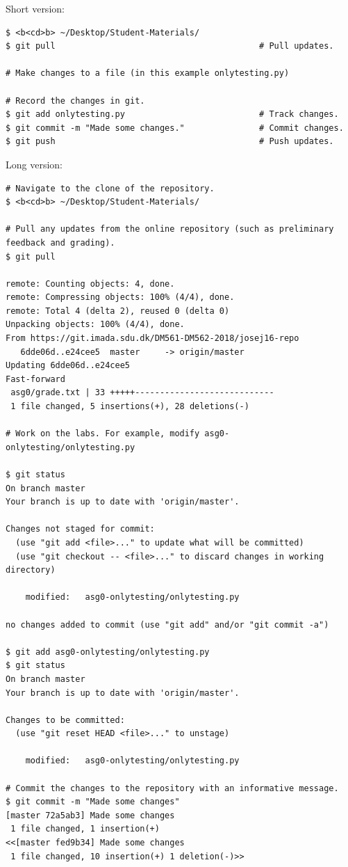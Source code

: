 Short version:
\begin{lstlisting}
$ <b<cd>b> ~/Desktop/Student-Materials/
$ git pull                                         # Pull updates.

# Make changes to a file (in this example onlytesting.py)

# Record the changes in git.
$ git add onlytesting.py                           # Track changes.
$ git commit -m "Made some changes."               # Commit changes.
$ git push                                         # Push updates.
\end{lstlisting}

Long version:
\begin{lstlisting}
# Navigate to the clone of the repository.
$ <b<cd>b> ~/Desktop/Student-Materials/

# Pull any updates from the online repository (such as preliminary feedback and grading).
$ git pull

remote: Counting objects: 4, done.
remote: Compressing objects: 100% (4/4), done.
remote: Total 4 (delta 2), reused 0 (delta 0)
Unpacking objects: 100% (4/4), done.
From https://git.imada.sdu.dk/DM561-DM562-2018/josej16-repo
   6dde06d..e24cee5  master     -> origin/master
Updating 6dde06d..e24cee5
Fast-forward
 asg0/grade.txt | 33 +++++----------------------------
 1 file changed, 5 insertions(+), 28 deletions(-)

# Work on the labs. For example, modify asg0-onlytesting/onlytesting.py

$ git status
On branch master
Your branch is up to date with 'origin/master'.

Changes not staged for commit:
  (use "git add <file>..." to update what will be committed)
  (use "git checkout -- <file>..." to discard changes in working directory)

	modified:   asg0-onlytesting/onlytesting.py

no changes added to commit (use "git add" and/or "git commit -a")

$ git add asg0-onlytesting/onlytesting.py
$ git status
On branch master
Your branch is up to date with 'origin/master'.

Changes to be committed:
  (use "git reset HEAD <file>..." to unstage)

	modified:   asg0-onlytesting/onlytesting.py

# Commit the changes to the repository with an informative message.
$ git commit -m "Made some changes"
[master 72a5ab3] Made some changes
 1 file changed, 1 insertion(+)
<<[master fed9b34] Made some changes
 1 file changed, 10 insertion(+) 1 deletion(-)>>


\end{lstlisting}

